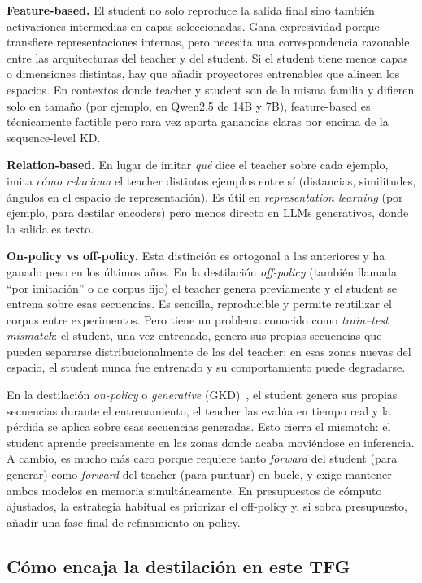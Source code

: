 \textbf{Feature-based.} El student no solo reproduce la salida final sino también activaciones intermedias en capas seleccionadas. Gana expresividad porque transfiere representaciones internas, pero necesita una correspondencia razonable entre las arquitecturas del teacher y del student. Si el student tiene menos capas o dimensiones distintas, hay que añadir proyectores entrenables que alineen los espacios. En contextos donde teacher y student son de la misma familia y difieren solo en tamaño (por ejemplo, en Qwen2.5 de 14B y 7B), feature-based es técnicamente factible pero rara vez aporta ganancias claras por encima de la sequence-level KD.

\textbf{Relation-based.} En lugar de imitar \emph{qué} dice el teacher sobre cada ejemplo, imita \emph{cómo relaciona} el teacher distintos ejemplos entre sí (distancias, similitudes, ángulos en el espacio de representación). Es útil en \textit{representation learning} (por ejemplo, para destilar encoders) pero menos directo en LLMs generativos, donde la salida es texto.

\textbf{On-policy vs off-policy.} Esta distinción es ortogonal a las anteriores y ha ganado peso en los últimos años. En la destilación \textit{off-policy} (también llamada ``por imitación'' o de corpus fijo) el teacher genera previamente y el student se entrena sobre esas secuencias. Es sencilla, reproducible y permite reutilizar el corpus entre experimentos. Pero tiene un problema conocido como \textit{train--test mismatch}: el student, una vez entrenado, genera sus propias secuencias que pueden separarse distribucionalmente de las del teacher; en esas zonas nuevas del espacio, el student nunca fue entrenado y su comportamiento puede degradarse.

En la destilación \textit{on-policy} o \textit{generative} (GKD)~\cite{agarwal2024gkd}, el student genera sus propias secuencias durante el entrenamiento, el teacher las evalúa en tiempo real y la pérdida se aplica sobre esas secuencias generadas. Esto cierra el mismatch: el student aprende precisamente en las zonas donde acaba moviéndose en inferencia. A cambio, es mucho más caro porque requiere tanto \textit{forward} del student (para generar) como \textit{forward} del teacher (para puntuar) en bucle, y exige mantener ambos modelos en memoria simultáneamente. En presupuestos de cómputo ajustados, la estrategia habitual es priorizar el off-policy y, si sobra presupuesto, añadir una fase final de refinamiento on-policy.

\subsection{Cómo encaja la destilación en este TFG}

